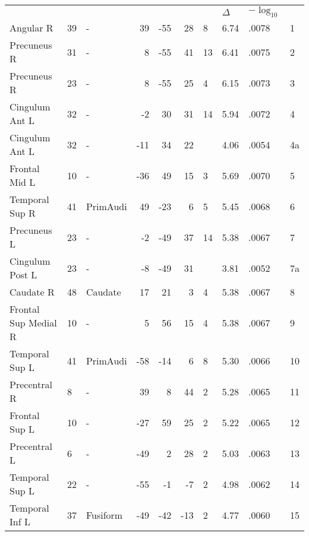 \begin{table}
    \small
    \centering
    \begin{ThreePartTable}
        \begin{tabularx}{\textwidth}{l l p{1.6cm} *{3}{r} *{2}{P{.8cm}} P{1.3cm} P{.5cm}}


     \\
    \toprule
     &  &  &  &  &  &  & \(\Delta\)  & \(-\log_{10}\) &  \\
    \toprule

    Angular R & 39 & - & 39 & -55 & 28 & 8 &6.74&.0078& 1 \\
    Precuneus R & 31 & - & 8 & -55 & 41 & 13 &6.41&.0075& 2 \\
    Precuneus R & 23 & - & 8 & -55 & 25 & 4 &6.15&.0073& 3 \\
    \midrule
    Cingulum Ant L & 32 & - & -2 & 30 & 31 & 14 &5.94&.0072& 4 \\
    Cingulum Ant L & 32 & - & -11 & 34 & 22 &   &4.06&.0054& 4a \\
    Frontal Mid L & 10 & - & -36 & 49 & 15 & 3 &5.69&.0070& 5 \\
    Temporal Sup R & 41 & PrimAudi & 49 & -23 & 6 & 5 &5.45&.0068& 6 \\
    Precuneus L & 23 & - & -2 & -49 & 37 & 14 &5.38&.0067& 7 \\
    Cingulum Post L & 23 & - & -8 & -49 & 31 &   &3.81&.0052& 7a \\
    Caudate R & 48 & Caudate & 17 & 21 & 3 & 4 &5.38&.0067& 8 \\
    Frontal Sup Medial R & 10 & - & 5 & 56 & 15 & 4 &5.38&.0067& 9 \\
    Temporal Sup L & 41 & PrimAudi & -58 & -14 & 6 & 8 &5.30&.0066& 10 \\
    Precentral R & 8 & - & 39 & 8 & 44 & 2 &5.28&.0065& 11 \\
    Frontal Sup L & 10 & - & -27 & 59 & 25 & 2 &5.22&.0065& 12 \\
    Precentral L & 6 & - & -49 & 2 & 28 & 2 &5.03&.0063& 13 \\
    Temporal Sup L & 22 & - & -55 & -1 & -7 & 2 &4.98&.0062& 14 \\
    Temporal Inf L & 37 & Fusiform & -49 & -42 & -13 & 2 &4.77&.0060& 15 \\

\end{tabularx}
\end{ThreePartTable}
\end{table}
